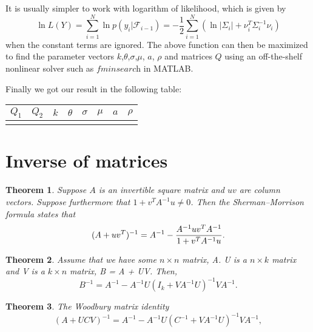 \documentclass{amsart}
\newtheorem{thm}{Theorem}[section]
\numberwithin{equation}{section}
\begin{document}
It is usually simpler to work with logarithm of likelihood, which is given by 
$$
\ln L(Y) = \sum_{i=1}^{N}\ln p(y_{i}|\mathcal F_{i-1})=-\frac{1}{2}\sum_{i=1}^{N}(\ln|\Sigma_{i}|+\nu_{i}^{T} \Sigma_{i}^{-1}\nu_{i})
$$
when the constant terms are ignored. The above function can then be maximized to find the parameter vectors $k$,$\theta$,$\sigma$,$\mu$, $a$, $\rho$ and matrices $Q$ using an off-the-shelf nonlinear solver such as $\textit{fminsearch}$ in MATLAB. 

Finally we got our result in the following table:

\begin{table}[!ht]
\begin{tabular}{cccccccc} \hline 
 $Q_{1}$ & $Q_{2}$ & $k$ & $\theta$ & $\sigma$ & $\mu$ & $a$ & $\rho$ 
 \\ \hline 
  &   &  &  &   &   &   &  \\\hline 
\end{tabular}
\end{table}

\appendix
\section{Inverse of matrices}
\begin{thm}
 Suppose ${\displaystyle A}$ is an invertible square matrix and $ {\displaystyle u}   {\displaystyle v}$ are column vectors. Suppose furthermore that $ \displaystyle 1+v^{T}A^{-1}u\neq 0    $. Then the Sherman–Morrison formula states that
\[ {\displaystyle (A+uv^{T})^{-1}=A^{-1}-{A^{-1}uv^{T}A^{-1} \over 1+v^{T}A^{-1}u}.}  \] 
\end{thm}

\begin{thm}
Assume that we have some $n\times n$ matrix, A. U is a  $n\times k$  matrix and V is a  $k\times n$  matrix, B = A + UV. Then,
%
 \[{\displaystyle {B^{-1}}={A^{-1}}-{A^{-1}}U{\left({{I_{k}}+V{A^{-1}}U}\right)^{-1}}V{A^{-1}}} .\]
\end{thm}

\begin{thm}
 The Woodbury matrix identity 
   \[ \displaystyle \left(A+UCV\right)^{-1}=A^{-1}-A^{-1}U\left(C^{-1}+VA^{-1}U\right)^{-1}VA^{-1},   \]
\end{thm}
\end{document}
